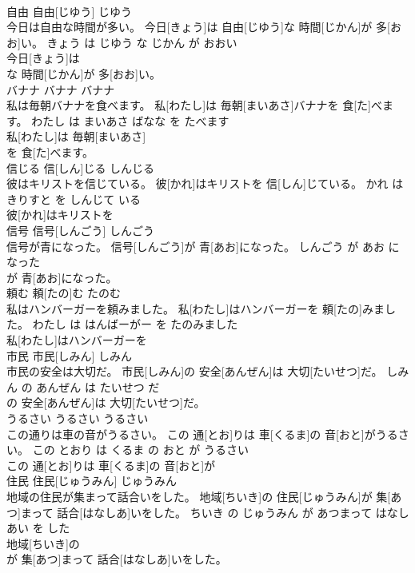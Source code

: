 \documentclass[8pt]{extreport}
\begin{document}
\begin{CJK}{UTF8}{min}
\\	自由	自由[じゆう]	じゆう	
\\	今日は自由な時間が多い。	今日[きょう]は 自由[じゆう]な 時間[じかん]が 多[おお]い。	きょう は じゆう な じかん が おおい	
\\	今日[きょう]は
\\	な 時間[じかん]が 多[おお]い。		
\\	バナナ	バナナ	バナナ	
\\	私は毎朝バナナを食べます。	私[わたし]は 毎朝[まいあさ]バナナを 食[た]べます。	わたし は まいあさ ばなな を たべます	
\\	私[わたし]は 毎朝[まいあさ]
\\	を 食[た]べます。		
\\	信じる	信[しん]じる	しんじる	
\\	彼はキリストを信じている。	彼[かれ]はキリストを 信[しん]じている。	かれ は きりすと を しんじて いる	
\\	彼[かれ]はキリストを
\\	信号	信号[しんごう]	しんごう	
\\	信号が青になった。	信号[しんごう]が 青[あお]になった。	しんごう が あお に なった	
\\	が 青[あお]になった。		
\\	頼む	頼[たの]む	たのむ	
\\	私はハンバーガーを頼みました。	私[わたし]はハンバーガーを 頼[たの]みました。	わたし は はんばーがー を たのみました	
\\	私[わたし]はハンバーガーを
\\	市民	市民[しみん]	しみん	
\\	市民の安全は大切だ。	市民[しみん]の 安全[あんぜん]は 大切[たいせつ]だ。	しみん の あんぜん は たいせつ だ	
\\	の 安全[あんぜん]は 大切[たいせつ]だ。		
\\	うるさい	うるさい	うるさい	
\\	この通りは車の音がうるさい。	この 通[とお]りは 車[くるま]の 音[おと]がうるさい。	この とおり は くるま の おと が うるさい	
\\	この 通[とお]りは 車[くるま]の 音[おと]が
\\	住民	住民[じゅうみん]	じゅうみん	
\\	地域の住民が集まって話合いをした。	地域[ちいき]の 住民[じゅうみん]が 集[あつ]まって 話合[はなしあ]いをした。	ちいき の じゅうみん が あつまって はなしあい を した	
\\	地域[ちいき]の
\\	が 集[あつ]まって 話合[はなしあ]いをした。		

\end{CJK}
\end{document}
